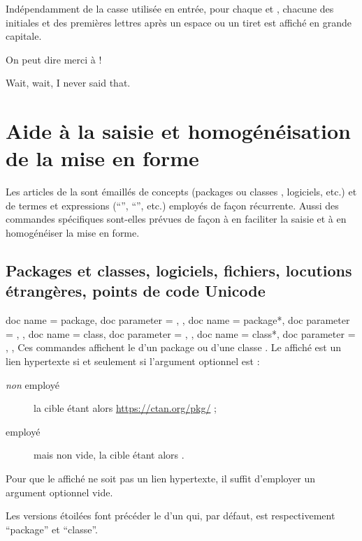 \documentclass{letgut}
\begin{document}
Indépendamment de la casse utilisée en entrée, pour chaque  et
, chacune des initiales et des premières lettres après un espace ou
un tiret est affiché en grande capitale.

\begin{ltx-code-result}[title addon=personnes]
On peut dire merci à
 !
\end{ltx-code-result}

\begin{ltx-code-result}[title addon=auteur,listing options app={deletekeywords={[3]{author}}}]
\begin{displayquote} %
  Wait, wait, I never said that.
  \author{knuth, dONALD e.}
\end{displayquote}
\end{ltx-code-result}

\section{Aide à la saisie et homogénéisation de la mise en forme}
\label{sec:aide-la-saisie}

Les articles de la  sont émaillés de concepts (packages ou classes
, logiciels, etc.) et de termes et expressions
(\enquote{\gut{}}, \enquote{}, etc.) employés de façon
récurrente. Aussi des commandes spécifiques sont-elles prévues de façon à en
faciliter la saisie et à en homogénéiser la mise en forme.

\subsection{Packages et classes, logiciels, fichiers, locutions étrangères,
  points de code Unicode}
\label{sec:classes-packages-et}

\begin{docCommands}
  {
    {
      doc name = package,
      doc parameter = ,
    },
    {
      doc name = package*,
      doc parameter = ,
    },
    {
      doc name = class,
      doc parameter = ,
    },
    {
      doc name = class*,
      doc parameter = ,
    },
  }
  Ces commandes affichent le  d'un package ou d'une classe
  . Le  affiché est un lien hypertexte si et seulement
  si l'argument optionnel est :
  \begin{description}
  \item[\emph{non} employé] la cible étant alors
    \url{https://ctan.org/pkg/} ;
  \item[ employé] mais non vide, la cible étant alors
    .
  \end{description}
  Pour que le  affiché ne soit pas un lien hypertexte, il suffit
  d'employer un argument optionnel vide.

  Les versions étoilées font précéder le  d'un  qui, par
  défaut, est respectivement \enquote{package} et \enquote{classe}.
\end{docCommands}
\end{document}
